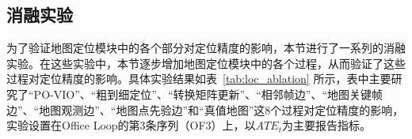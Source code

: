 \subsection{消融实验}

为了验证地图定位模块中的各个部分对定位精度的影响，本节进行了一系列的消融实验。在这些实验中，本节逐步增加地图定位模块中的各个过程，从而验证了这些过程对定位精度的影响。具体实验结果如表~\ref{tab:loc_ablation} 所示，表中主要研究了“PO-VIO”、“粗到细定位”、“转换矩阵更新”、“相邻帧边”、“地图关键帧边”、“地图观测边”、“地图点先验边”和“真值地图”这8个过程对定位精度的影响，实验设置在Office Loop的第3条序列（OF3）上，以$ATE_t$为主要报告指标。

